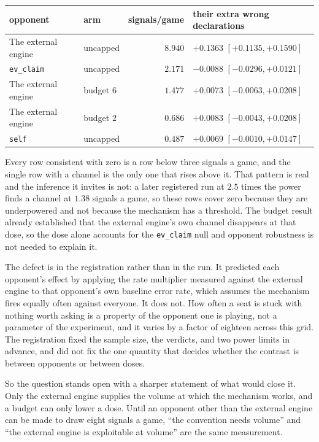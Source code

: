 \documentclass[11pt,letterpaper]{article}
\begin{document}
\begin{center}
\small
\begin{tabular}{llrl}
\toprule
opponent & arm & signals/game & their extra wrong declarations \\
\midrule
The external engine & uncapped  & $8.940$ & $+0.1363$ $[+0.1135, +0.1590]$ \\
\texttt{ev\_claim}  & uncapped  & $2.171$ & $-0.0088$ $[-0.0296, +0.0121]$ \\
The external engine & budget $6$ & $1.477$ & $+0.0073$ $[-0.0063, +0.0208]$ \\
The external engine & budget $2$ & $0.686$ & $+0.0083$ $[-0.0043, +0.0208]$ \\
\texttt{self}       & uncapped  & $0.487$ & $+0.0069$ $[-0.0010, +0.0147]$ \\
\bottomrule
\end{tabular}
\end{center}

\noindent Every row consistent with zero is a row below three signals a game,
and the single row with a channel is the only one that rises above it. That
pattern is real and the inference it invites is not: a later registered run at
$2.5$ times the power finds a channel at $1.38$ signals a game, so these rows
cover zero because they are underpowered and not because the mechanism has a
threshold. The
budget result already established that the external engine's own channel
disappears at that dose, so the dose alone accounts for the
\texttt{ev\_claim} null and opponent robustness is not needed to explain it.

The defect is in the registration rather than in the run. It predicted each
opponent's effect by applying the rate multiplier measured against
the external engine to that opponent's own baseline error rate, which assumes
the mechanism fires equally often against everyone. It does not. How often a
seat is stuck with nothing worth asking is a property of the opponent one is
playing, not a parameter of the experiment, and it varies by a factor of
eighteen across this grid. The registration fixed the sample size, the
verdicts, and two power limits in advance, and did not fix the one quantity
that decides whether the contrast is between opponents or between doses.

So the question stands open with a sharper statement of what would close it.
Only the external engine supplies the volume at which the mechanism works, and
a budget can only lower a dose. Until an opponent other than the external engine
can be made to draw eight signals a game, ``the convention needs volume'' and
``the external engine is exploitable at volume'' are the same measurement.
\end{document}

